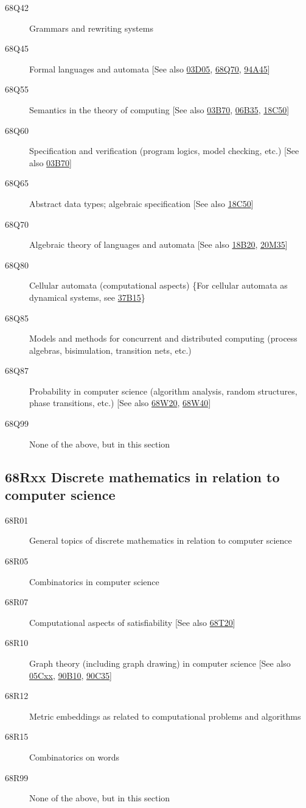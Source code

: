 \begin{description}
\item [68Q42]\label{68Q42} Grammars and rewriting systems
\item [68Q45]\label{68Q45} Formal languages and automata [See also \hyperref[03D05]{03D05}, \hyperref[68Q70]{68Q70}, \hyperref[94A45]{94A45}]
\item [68Q55]\label{68Q55} Semantics in the theory of computing [See also \hyperref[03B70]{03B70}, \hyperref[06B35]{06B35}, \hyperref[18C50]{18C50}]
\item [68Q60]\label{68Q60} Specification and verification (program logics, model checking, etc.) [See also \hyperref[03B70]{03B70}]
\item [68Q65]\label{68Q65} Abstract data types; algebraic specification [See also \hyperref[18C50]{18C50}]
\item [68Q70]\label{68Q70} Algebraic theory of languages and automata [See also \hyperref[18B20]{18B20}, \hyperref[20M35]{20M35}]
\item [68Q80]\label{68Q80} Cellular automata (computational aspects) \{For cellular automata as dynamical systems, see \hyperref[37B15]{37B15}\}
\item [68Q85]\label{68Q85} Models and methods for concurrent and distributed computing (process algebras, bisimulation, transition nets, etc.)
\item [68Q87]\label{68Q87} Probability in computer science (algorithm analysis, random structures, phase transitions, etc.) [See also \hyperref[68W20]{68W20}, \hyperref[68W40]{68W40}]
\item [68Q99]\label{68Q99} None of the above, but in this section
\end{description}
\subsection*{68Rxx  Discrete mathematics in relation to computer science }\label{68Rxx}
\begin{description}
\item [68R01]\label{68R01} General topics of discrete mathematics in relation to computer science
\item [68R05]\label{68R05} Combinatorics in computer science
\item [68R07]\label{68R07} Computational aspects of satisfiability [See also \hyperref[68T20]{68T20}]
\item [68R10]\label{68R10} Graph theory (including graph drawing) in computer science [See also \hyperref[05Cxx]{05Cxx}, \hyperref[90B10]{90B10}, \hyperref[90C35]{90C35}]
\item [68R12]\label{68R12} Metric embeddings as related to computational problems and algorithms
\item [68R15]\label{68R15} Combinatorics on words 
\item [68R99]\label{68R99} None of the above, but in this section
\end{description}
